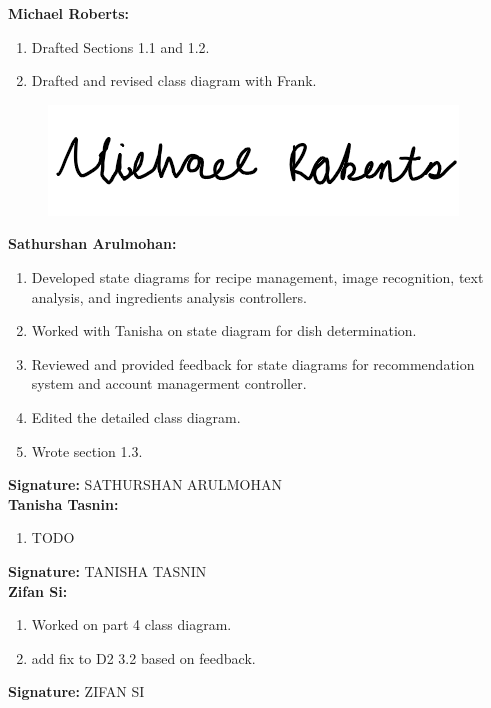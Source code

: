 \documentclass[]{article}
\begin{document}
\textbf{Michael Roberts:}
\begin{enumerate}
	\item Drafted Sections 1.1 and 1.2.
	\item Drafted and revised class diagram with Frank.
\end{enumerate}

\begin{figure}[H]
 	\centering
    \includegraphics[width=\textwidth]{image/A_Michael_Roberts_Signature.png}
\end{figure}

\textbf{Sathurshan Arulmohan:}
\begin{enumerate}
	\item Developed state diagrams for recipe management, image recognition, text analysis, and ingredients analysis controllers.
	\item Worked with Tanisha on state diagram for dish determination.
	\item Reviewed and provided feedback for state diagrams for recommendation system and account managerment controller.
	\item Edited the detailed class diagram.
	\item Wrote section 1.3.
\end{enumerate}

\textbf{Signature:} SATHURSHAN ARULMOHAN \\

\textbf{Tanisha Tasnin:}
\begin{enumerate}
	\item TODO
\end{enumerate}

\textbf{Signature:} TANISHA TASNIN \\

\textbf{Zifan Si:}
\begin{enumerate}
	\item Worked on part 4 class diagram.
	\item add fix to D2 3.2 based on feedback.
\end{enumerate}

\textbf{Signature:} ZIFAN SI  \\
\end{document}
